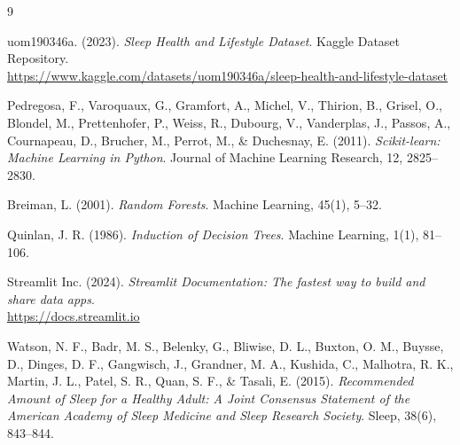\documentclass[12pt,a4paper]{article}
\begin{document}
\newpage
\begin{thebibliography}{9}

uom190346a. (2023). \textit{Sleep Health and Lifestyle Dataset}. Kaggle Dataset Repository. \\
\url{https://www.kaggle.com/datasets/uom190346a/sleep-health-and-lifestyle-dataset}

Pedregosa, F., Varoquaux, G., Gramfort, A., Michel, V., Thirion, B., Grisel, O., Blondel, M., Prettenhofer, P., Weiss, R., Dubourg, V., Vanderplas, J., Passos, A., Cournapeau, D., Brucher, M., Perrot, M., \& Duchesnay, E. (2011). \textit{Scikit-learn: Machine Learning in Python}. Journal of Machine Learning Research, 12, 2825--2830.

Breiman, L. (2001). \textit{Random Forests}. Machine Learning, 45(1), 5--32.

Quinlan, J. R. (1986). \textit{Induction of Decision Trees}. Machine Learning, 1(1), 81--106.

Streamlit Inc. (2024). \textit{Streamlit Documentation: The fastest way to build and share data apps}. \\
\url{https://docs.streamlit.io}

Watson, N. F., Badr, M. S., Belenky, G., Bliwise, D. L., Buxton, O. M., Buysse, D., Dinges, D. F., Gangwisch, J., Grandner, M. A., Kushida, C., Malhotra, R. K., Martin, J. L., Patel, S. R., Quan, S. F., \& Tasali, E. (2015). \textit{Recommended Amount of Sleep for a Healthy Adult: A Joint Consensus Statement of the American Academy of Sleep Medicine and Sleep Research Society}. Sleep, 38(6), 843--844.

\end{thebibliography}
\end{document}
